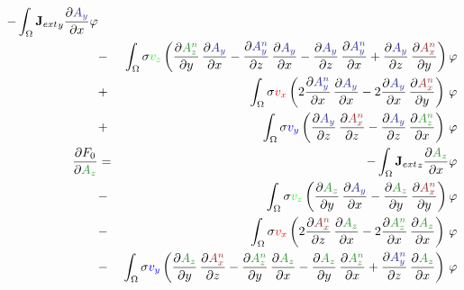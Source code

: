 \documentclass[smallextended]{svjour3}       %
\begin{document}
\begin{eqnarray}
			-\int_{\Omega} {\mathbf{J}_{ext}}_y \frac{\partial \textcolor{darkBlue}{A_y}}{\partial x} \varphi
			\nonumber \\
			& - & \int_{\Omega} \sigma \textcolor{green}{v_z} \left(\frac{\partial \textcolor{darkGreen}{A_z^n}}{\partial y}\,\frac{\partial \textcolor{darkBlue}{A_y}}{\partial x} - \frac{\partial \textcolor{darkBlue}{A_y^n}}{\partial z}\,\frac{\partial \textcolor{darkBlue}{A_y}}{\partial x} - \frac{\partial \textcolor{darkBlue}{A_y}}{\partial z}\,\frac{\partial \textcolor{darkBlue}{A_y^n}}{\partial x} + \frac{\partial \textcolor{darkBlue}{A_y}}{\partial z}\,\frac{\partial \textcolor{darkRed}{A_x^n}}{\partial y} \right) \varphi \nonumber \\			
			& + &\int_{\Omega} \sigma \textcolor{red}{v_x} \left(2 \frac{\partial \textcolor{darkBlue}{A_y^n}}{\partial x}\,\frac{\partial \textcolor{darkBlue}{A_y}}{\partial x} - 2 \frac{\partial \textcolor{darkBlue}{A_y}}{\partial x}\,\frac{\partial \textcolor{darkRed}{A_x^n}}{\partial y}\right)\, \varphi \nonumber \\		
			& + & \int_{\Omega} \sigma \textcolor{blue}{v_y} \left(\frac{\partial \textcolor{darkBlue}{A_y}}{\partial z}\,\frac{\partial \textcolor{darkRed}{A_x^n}}{\partial z} - \frac{\partial \textcolor{darkBlue}{A_y}}{\partial z}\,\frac{\partial \textcolor{darkGreen}{A_z^n}}{\partial x} \right)\, \varphi \\			
			\frac{\partial F_0}{\partial \textcolor{darkGreen}{A_z}} & = &
			-\int_{\Omega} {\mathbf{J}_{ext}}_z \frac{\partial \textcolor{darkGreen}{A_z}}{\partial x} \varphi
			\nonumber \\
			& - & \int_{\Omega} \sigma \textcolor{green}{v_z} \left(\frac{\partial \textcolor{darkGreen}{A_z}}{\partial y}\,\frac{\partial \textcolor{darkBlue}{A_y}}{\partial x} - \frac{\partial \textcolor{darkGreen}{A_z}}{\partial y}\,\frac{\partial \textcolor{darkRed}{A_x^n}}{\partial y}\right) \varphi \nonumber \\			
			& - & \int_{\Omega} \sigma \textcolor{red}{v_x} \left( 2 \frac{\partial \textcolor{darkRed}{A_x^n}}{\partial z}\,\frac{\partial \textcolor{darkGreen}{A_z}}{\partial x} - 2 \frac{\partial \textcolor{darkGreen}{A_z^n}}{\partial x}\,\frac{\partial \textcolor{darkGreen}{A_z}}{\partial x} \right)\, \varphi \nonumber \\			
			& - & \int_{\Omega} \sigma \textcolor{blue}{v_y} \left(\frac{\partial \textcolor{darkGreen}{A_z}}{\partial y}\,\frac{\partial \textcolor{darkRed}{A_x^n}}{\partial z} - \frac{\partial \textcolor{darkGreen}{A_z^n}}{\partial y}\,\frac{\partial \textcolor{darkGreen}{A_z}}{\partial x} - \frac{\partial \textcolor{darkGreen}{A_z}}{\partial y}\,\frac{\partial \textcolor{darkGreen}{A_z^n}}{\partial x} + \frac{\partial \textcolor{darkBlue}{A_y^n}}{\partial z}\,\frac{\partial \textcolor{darkGreen}{A_z}}{\partial x} \right)\, \varphi
		\end{eqnarray}
		
\end{document}
